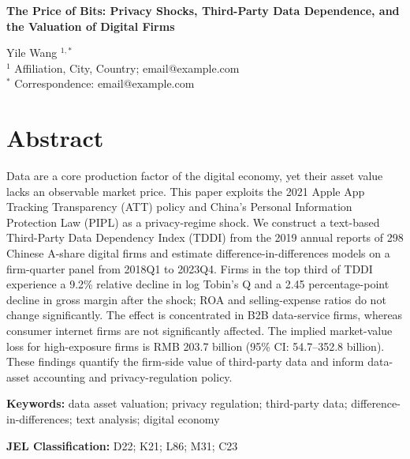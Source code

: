 \documentclass[11pt]{article}
\begin{document}
\begin{center}
{\Large\bfseries The Price of Bits: Privacy Shocks, Third-Party Data Dependence, and the Valuation of Digital Firms}
\end{center}

\vspace{0.2cm}

\begin{center}
Yile Wang $^{1,*}$\\
\vspace{0.15cm}
{\small $^{1}$ Affiliation, City, Country; email@example.com}\\
{\small $^{*}$ Correspondence: email@example.com}
\end{center}

\vspace{0.2cm}

\section*{Abstract}
\noindent
Data are a core production factor of the digital economy, yet their asset value lacks an observable market price. This paper exploits the 2021 Apple App Tracking Transparency (ATT) policy and China's Personal Information Protection Law (PIPL) as a privacy-regime shock. We construct a text-based Third-Party Data Dependency Index (TDDI) from the 2019 annual reports of 298 Chinese A-share digital firms and estimate difference-in-differences models on a firm-quarter panel from 2018Q1 to 2023Q4. Firms in the top third of TDDI experience a 9.2\% relative decline in log Tobin's Q and a 2.45 percentage-point decline in gross margin after the shock; ROA and selling-expense ratios do not change significantly. The effect is concentrated in B2B data-service firms, whereas consumer internet firms are not significantly affected. The implied market-value loss for high-exposure firms is RMB 203.7 billion (95\% CI: 54.7--352.8 billion). These findings quantify the firm-side value of third-party data and inform data-asset accounting and privacy-regulation policy.

\vspace{0.2cm}
\noindent\textbf{Keywords:} data asset valuation; privacy regulation; third-party data; difference-in-differences; text analysis; digital economy

\vspace{0.1cm}
\noindent\textbf{JEL Classification:} D22; K21; L86; M31; C23

\vspace{0.3cm}
\end{document}
